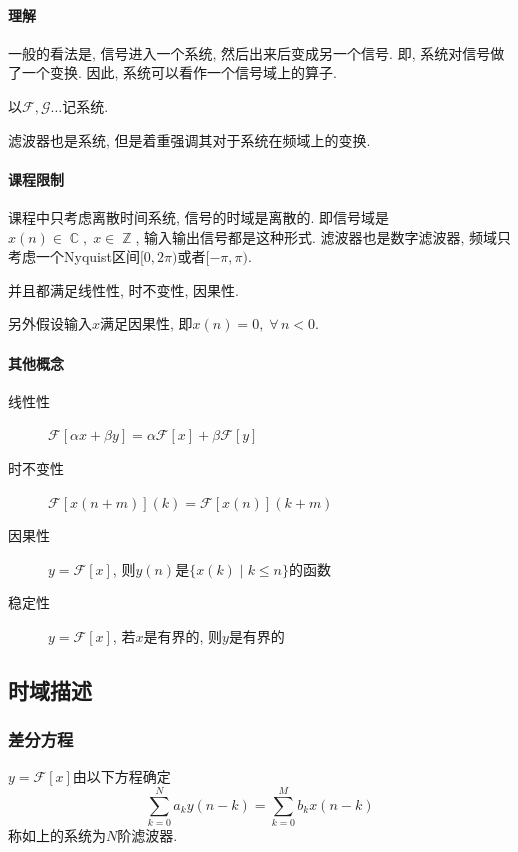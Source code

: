 \documentclass{ctexart}
\DeclareMathOperator{\Cset}{\mathbb{C}}
\DeclareMathOperator{\Zset}{\mathbb{Z}}
\begin{document}
\paragraph{理解}
    一般的看法是, 信号进入一个系统, 然后出来后变成另一个信号. 即, 系统对信号做了一个变换.
    因此, 系统可以看作一个信号域上的算子.\par
    以$\mathcal{F}, \mathcal{G}\ldots$记系统.\par
    滤波器也是系统, 但是着重强调其对于系统在频域上的变换.
\paragraph{课程限制}
    课程中只考虑离散时间系统, 信号的时域是离散的.
    即信号域是$x(n) \in \Cset,\; x\in \Zset$, 输入输出信号都是这种形式.
    滤波器也是数字滤波器, 频域只考虑一个Nyquist区间$[0, 2\pi)$或者$[-\pi, \pi)$.\par
    并且都满足线性性, 时不变性, 因果性.\par
    另外假设输入$x$满足因果性, 即$x(n) = 0, \;\forall\, n < 0$.
\paragraph{其他概念}
    \begin{description}
        \item[线性性] $\mathcal{F}[\alpha x + \beta y] = \alpha \mathcal{F}[x] + \beta \mathcal{F}[y]$
        \item[时不变性] $\mathcal{F}[x(n + m)](k) = \mathcal{F}[x(n)](k + m)$
        \item[因果性] $y = \mathcal{F}[x]$, 则$y(n)$是$\{ x(k) \;|\; k \le n \}$的函数
        \item[稳定性] $y = \mathcal{F}[x]$, 若$x$是有界的, 则$y$是有界的
    \end{description}

\subsection{时域描述}
\subsubsection{差分方程}
    $y = \mathcal{F}[x]$由以下方程确定 \[
        \sum_{k = 0}^N a_k y(n - k)  = \sum_{k = 0}^M b_k x(n - k)\]
    称如上的系统为$N$阶滤波器.
\end{document}
